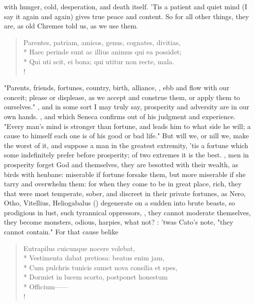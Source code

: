 {with hunger, cold, desperation, and death itself. 'Tis a patient and quiet mind (I say it again and again) gives true peace and content. So for all other things, they are, as old Chremes told us, as we use them.

\begin{latin}
\begin{verse}%
Parentes, patriam, amicos, genus, cognates, divitias,\\*
Haec perinde sunt ac illius animus qui ea possidet;\\*
Qui uti scit, ei bona; qui utitur non recte, mala.\\!
\end{verse}%
\end{latin}

"Parents, friends, fortunes, country, birth, alliance, \etc{}, ebb and flow with our conceit; please or displease, as we accept and construe them, or apply them to ourselves." , and in some sort I may truly say, prosperity and adversity are in our own hands. , and which Seneca confirms out of his judgment and experience. "Every man's mind is stronger than fortune, and leads him to what side he will; a cause to himself each one is of his good or bad life." But will we, or nill we, make the worst of it, and suppose a man in the greatest extremity, 'tis a fortune which some indefinitely prefer before prosperity; of two extremes it is the best. , men in prosperity forget God and themselves, they are besotted with their wealth, as birds with henbane: miserable if fortune forsake them, but more miserable if she tarry and overwhelm them: for when they come to be in great place, rich, they that were most temperate, sober, and discreet in their private fortunes, as Nero, Otho, Vitellius, Heliogabalus () degenerate on a sudden into brute beasts, so prodigious in lust, such tyrannical oppressors, \etc{}, they cannot moderate themselves, they become monsters, odious, harpies, what not? : 'twas Cato's note, "they cannot contain." For that cause belike

\begin{latin}
\begin{verse}%
Eutrapilus cuicunque nocere volebat,\\*
Vestimenta dabat pretiosa: beatus enim jam,\\*
Cum pulchris tunicis sumet nova consilia et spes,\\*
Dormiet in lucem scorto, postponet honestum\\*
Officium------\\!
\end{verse}%
\end{latin}



}
